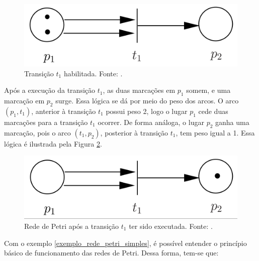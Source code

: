 \documentclass[
	12pt,				%
	openright,			%
	oneside,			%
	a4paper,			%
	english,			%
	brazil				%
	]{abntex2}
\theoremstyle{doispontos}
\begin{document}
\newpage

\begin{figure}[ht] 
	\centering
	\includegraphics[scale=0.3]{exemplo_simples_rede_petri_marcacao_p1.png}
	\caption[Rede de Petri Simples - Parte 2]{Transição $t_{1}$ habilitada. Fonte: \textcite{CassandrasLafortune08}.}
	\label{fig:rede_petri_simples_ex_02}
\end{figure}

Após a execução da transição $t_{1}$, as duas marcações em $p_{1}$ somem, e uma marcação em $p_{2}$ surge. Essa lógica se dá por meio do peso dos arcos. O arco $(p_{1},t_{1})$, anterior à transição $t_{1}$ possui peso 2, logo o lugar $p_{1}$ cede duas marcações para a transição $t_{1}$ ocorrer. De forma análoga, o lugar $p_{2}$ ganha uma marcação, pois o arco $(t_{1},p_{2})$, posterior à transição $t_{1}$, tem peso igual a 1. Essa lógica é ilustrada pela Figura \ref{fig:rede_petri_simples_ex_03}.

\begin{figure}[ht] 
	\centering
	\includegraphics[scale=0.3]{exemplo_simples_rede_petri_marcacao_p2.png}
	\caption[Rede de Petri Simples - Parte 3]{Rede de Petri após a transição $t_{1}$ ter sido executada. Fonte: \textcite{CassandrasLafortune08}.}
	\label{fig:rede_petri_simples_ex_03}
\end{figure}

Com o exemplo \ref{exemplo_rede_petri_simples}, é possível entender o princípio básico de funcionamento das redes de Petri. Dessa forma, tem-se que:
\end{document}
